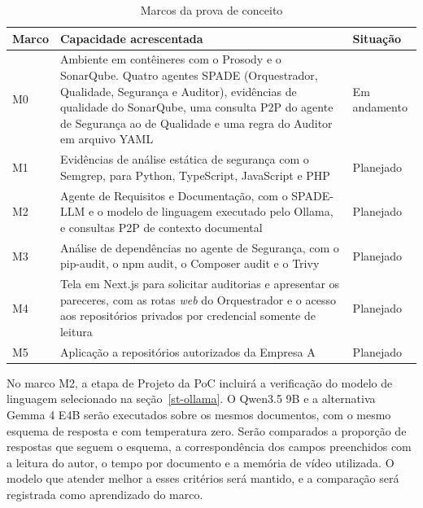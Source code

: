 \begin{table}[htbp]
\centering
\caption{Marcos da prova de conceito}
\label{tab-marcos}
\begingroup
\footnotesize
\SingleSpacing
\setlength{\tabcolsep}{4pt}
\renewcommand{\arraystretch}{1.15}
\begin{tabularx}{\textwidth}{>{\raggedright\arraybackslash}p{1.3cm}>{\raggedright\arraybackslash}X>{\raggedright\arraybackslash}p{2.2cm}}
\hline
\textbf{Marco} & \textbf{Capacidade acrescentada} & \textbf{Situação} \\ \hline
M0 & Ambiente em contêineres com o Prosody e o SonarQube. Quatro agentes SPADE (Orquestrador, Qualidade, Segurança e Auditor), evidências de qualidade do SonarQube, uma consulta P2P do agente de Segurança ao de Qualidade e uma regra do Auditor em arquivo YAML & Em andamento \\ \hline
M1 & Evidências de análise estática de segurança com o Semgrep, para Python, TypeScript, JavaScript e PHP & Planejado \\ \hline
M2 & Agente de Requisitos e Documentação, com o SPADE-LLM e o modelo de linguagem executado pelo Ollama, e consultas P2P de contexto documental & Planejado \\ \hline
M3 & Análise de dependências no agente de Segurança, com o pip-audit, o npm audit, o Composer audit e o Trivy & Planejado \\ \hline
M4 & Tela em Next.js para solicitar auditorias e apresentar os pareceres, com as rotas \textit{web} do Orquestrador e o acesso aos repositórios privados por credencial somente de leitura & Planejado \\ \hline
M5 & Aplicação a repositórios autorizados da Empresa A & Planejado \\ \hline
\end{tabularx}
\endgroup
{}
\end{table}

No marco M2, a etapa de Projeto da PoC incluirá a verificação do modelo de linguagem selecionado na seção~\ref{st-ollama}. O Qwen3.5 9B e a alternativa Gemma 4 E4B serão executados sobre os mesmos documentos, com o mesmo esquema de resposta e com temperatura zero. Serão comparados a proporção de respostas que seguem o esquema, a correspondência dos campos preenchidos com a leitura do autor, o tempo por documento e a memória de vídeo utilizada. O modelo que atender melhor a esses critérios será mantido, e a comparação será registrada como aprendizado do marco.

